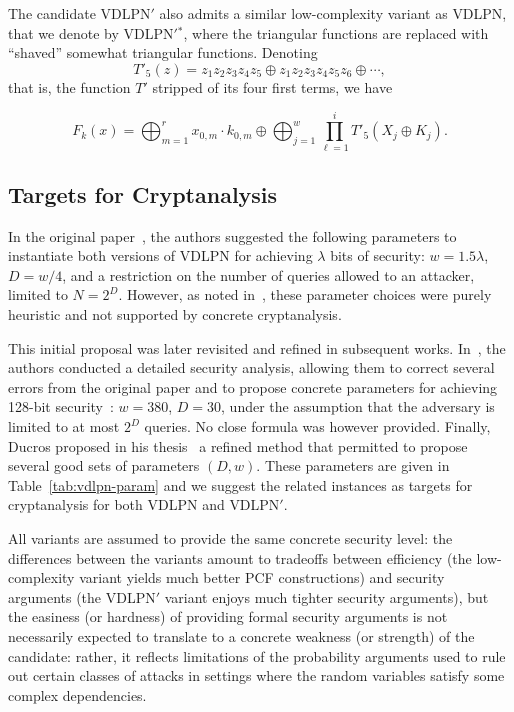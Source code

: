 The candidate {\sf VDLPN}$'$ also admits a similar low-complexity variant as {\sf VDLPN}, that we denote by {{\sf VDLPN}$'$}$^*$, where the triangular functions are replaced with ``shaved'' somewhat triangular functions. Denoting
\[T'_5(z) = z_1z_2z_3z_4z_5 \oplus z_1z_2z_3z_4z_5z_6 \oplus \cdots,\]
that is, the function $T'$ stripped of its four first terms, we have

\begin{equation} \label{eq:vdlpn*_low}
    F_k(x) = \bigoplus_{m=1}^{r} x_{0,m}\cdot k_{0,m} \oplus \bigoplus_{j=1}^w \prod_{\ell=1}^i T'_5(X_j \oplus K_j).
\end{equation}

\subsection{Targets for Cryptanalysis}

In the original paper~\cite{vdlpn}, the authors suggested the following parameters to instantiate both versions of {\sf VDLPN} for achieving $\lambda$ bits of security: $w = 1.5\lambda$, $D = w/4$, and a restriction on the number of queries allowed to an attacker, limited to $N = 2^D$. However, as noted in~\cite{PKC:CouDuc23}, these parameter choices were purely heuristic and not supported by concrete cryptanalysis.

This initial proposal was later revisited and refined in subsequent works. In~\cite{PKC:CouDuc23}, the authors conducted a detailed security analysis, allowing them to correct several errors from the original paper and to propose concrete parameters for achieving 128-bit security~: $w = 380$, $D = 30$, under the assumption that the adversary is limited to at most $2^D$ queries. No close formula was however provided. Finally, Ducros proposed in his thesis~\cite{Ducros24} a refined method that permitted to propose several good sets of parameters $(D,w)$. These parameters are given in Table~\ref{tab:vdlpn-param} and we suggest the related instances as targets for cryptanalysis for both {\sf VDLPN} and {\sf VDLPN}$'$.

All variants are assumed to provide the same concrete security level: the differences between the variants amount to tradeoffs between efficiency (the low-complexity variant yields much better PCF constructions) and security arguments (the {\sf VDLPN}$'$ variant enjoys much tighter security arguments), but the easiness (or hardness) of providing formal security arguments is not necessarily expected to translate to a concrete weakness (or strength) of the candidate: rather, it reflects limitations of the probability arguments used to rule out certain classes of attacks in settings where the random variables satisfy some complex dependencies.



